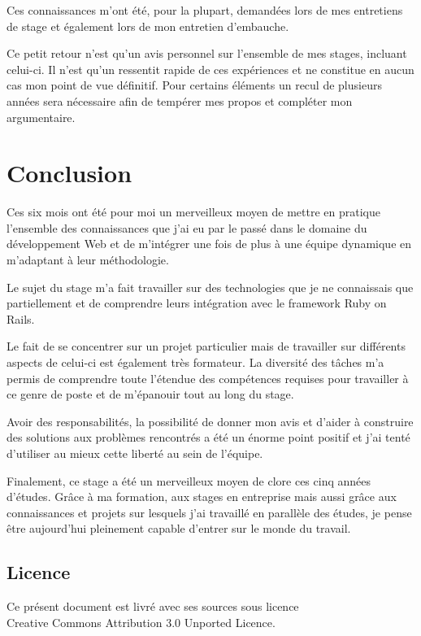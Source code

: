 \documentclass[12pt,a4paper]{book}
\begin{document}
Ces connaissances m'ont été, pour la plupart, demandées lors de mes entretiens de stage et également lors de  mon entretien d'embauche.

Ce petit retour n'est qu'un avis personnel sur l'ensemble de mes stages, incluant celui-ci. Il n'est qu'un ressentit rapide de ces expériences et ne constitue en aucun cas mon point de vue définitif. Pour certains éléments un recul de plusieurs années sera nécessaire afin de tempérer mes propos et compléter mon argumentaire.

\chapter*{Conclusion}

Ces six mois ont été pour moi un merveilleux moyen de mettre en pratique l'ensemble des connaissances que j'ai eu par le passé dans le domaine du développement Web et de m'intégrer une fois de plus à une équipe dynamique en m'adaptant à leur méthodologie.

Le sujet du stage m'a fait travailler sur des technologies que je ne connaissais que partiellement et de comprendre leurs intégration avec le framework Ruby on Rails.

Le fait de se concentrer sur un projet particulier mais de travailler sur différents aspects de celui-ci est également très formateur. La diversité des tâches m'a permis de comprendre toute l'étendue des compétences requises pour travailler à ce genre de poste et de m'épanouir tout au long du stage.

Avoir des responsabilités, la possibilité de donner mon avis et d'aider à construire des solutions aux problèmes rencontrés a été un énorme point positif et j'ai tenté d'utiliser au mieux cette liberté au sein de l'équipe.

Finalement, ce stage a été un merveilleux moyen de clore ces cinq années d'études. Grâce à ma formation, aux stages en entreprise mais aussi grâce aux connaissances et projets sur lesquels j'ai travaillé en parallèle des études, je pense être aujourd'hui pleinement capable d'entrer sur le monde du travail.

\listoffigures

\printglossaries

\newpage
{}
\section*{Licence}
\begin{center}
Ce présent document est livré avec ses sources sous licence\\
\ccby Creative Commons Attribution 3.0 Unported Licence.
\end{center}
\end{document}
